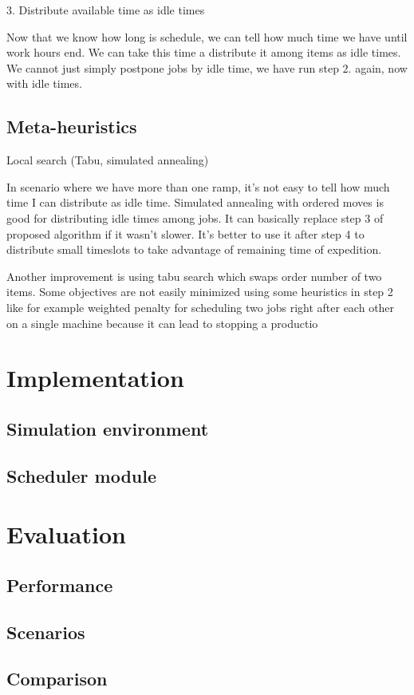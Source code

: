 \documentclass{ctuthesis}
\begin{document}
3. Distribute available time as idle times

Now that we know how long is schedule, we can tell how much time we have until work hours end. We can take this time a distribute it among items as idle times. We cannot just simply postpone jobs by idle time, we have run step 2. again, now with idle times.

\section{Meta-heuristics}
Local search (Tabu, simulated annealing)

In scenario where we have more than one ramp, it's not easy to tell how much time I can distribute as idle time. Simulated annealing with ordered moves is good for distributing idle times among jobs. It can basically replace step 3 of proposed algorithm if it wasn't slower. It's better to use it after step 4 to distribute small timeslots to take advantage of remaining time of expedition.

Another improvement is using tabu search which swaps order number of two items. Some objectives are not easily minimized using some heuristics in step 2 like for example weighted penalty for scheduling two jobs right after each other on a single machine because it can lead to stopping a productio

\chapter{Implementation}
\section{Simulation environment}
\section{Scheduler module}
\chapter{Evaluation}
\section{Performance}
\section{Scenarios}
\section{Comparison}
\end{document}
